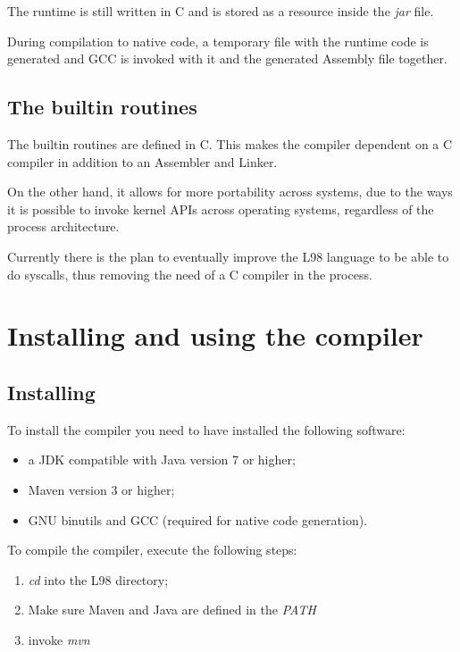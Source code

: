 \documentclass[a4paper, 11pt]{report}
\begin{document}
The runtime is still written in C and is stored as a resource inside the \emph{jar}
file.

During compilation to native code, a temporary file with the runtime code is generated
and GCC is invoked with it and the generated Assembly file together.

\section{The builtin routines}

  The builtin routines are defined in C. This makes the compiler dependent on a C
compiler in addition to an Assembler and Linker.

  On the other hand, it allows for more portability across systems, due to the
ways it is possible to invoke kernel APIs across operating systems, regardless of
the process architecture.

  Currently there is the plan to eventually improve the L98 language to be able to
do syscalls, thus removing the need of a C compiler in the process.

\chapter{Installing and using the compiler}

\section{Installing}
  To install the compiler you need to have installed the following software:

\begin{itemize}  
\item a JDK compatible with Java version 7 or higher;
\item Maven version 3 or higher;
\item GNU binutils and GCC (required for native code generation).
\end{itemize}

To compile the compiler, execute the following steps:

\begin{enumerate}
\item \emph{cd} into the L98 directory;
\item Make sure Maven and Java are defined in the \emph{PATH}
\item invoke \emph{mvn}
\end{enumerate}
\end{document}
